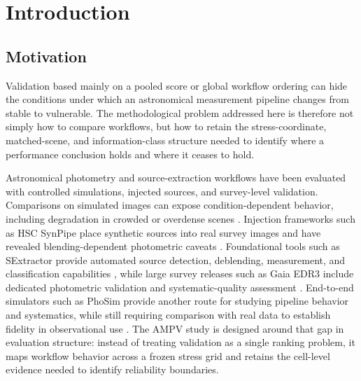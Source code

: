 \section{Introduction}\label{introduction}

\subsection{Motivation}\label{motivation}

Validation based mainly on a pooled score or global workflow ordering can
hide the conditions under which an astronomical measurement pipeline
changes from stable to vulnerable. The methodological problem addressed
here is therefore not simply how to compare workflows, but how to retain
the stress-coordinate, matched-scene, and information-class structure
needed to identify where a performance conclusion holds and where it
ceases to hold.

Astronomical photometry and source-extraction workflows have been
evaluated with controlled simulations, injected sources, and
survey-level validation. Comparisons on simulated images can expose
condition-dependent behavior, including degradation in crowded or
overdense scenes \cite{ref1}. Injection frameworks such as HSC SynPipe
place synthetic sources into real survey images and have revealed
blending-dependent photometric caveats \cite{ref2}. Foundational tools
such as SExtractor provide automated source detection, deblending,
measurement, and classification capabilities \cite{ref3}, while large
survey releases such as Gaia EDR3 include dedicated photometric
validation and systematic-quality assessment \cite{ref4}. End-to-end
simulators such as PhoSim provide another route for studying pipeline
behavior and systematics, while still requiring comparison with real
data to establish fidelity in observational use \cite{ref5}. The AMPV
study is designed around that gap in evaluation structure: instead of
treating validation as a single ranking problem, it maps workflow
behavior across a frozen stress grid and retains the cell-level evidence
needed to identify reliability boundaries.


